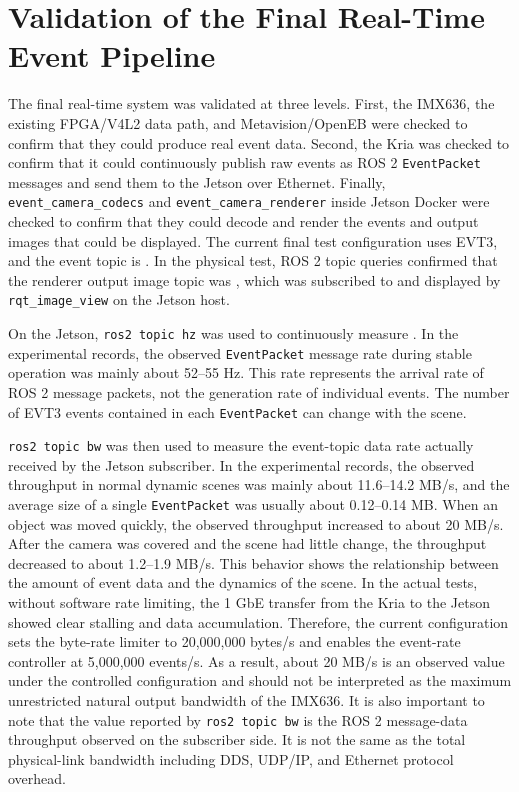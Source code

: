 \section{Validation of the Final Real-Time Event Pipeline}
\label{sec:realtime_results}

The final real-time system was validated at three levels. First, the IMX636, the existing FPGA/V4L2 data path, and Metavision/OpenEB were checked to confirm that they could produce real event data. Second, the Kria was checked to confirm that it could continuously publish raw events as ROS 2 \texttt{EventPacket} messages and send them to the Jetson over Ethernet. Finally, \texttt{event\_camera\_codecs} and \texttt{event\_camera\_renderer} inside Jetson Docker were checked to confirm that they could decode and render the events and output images that could be displayed. The current final test configuration uses EVT3, and the event topic is . In the physical test, ROS 2 topic queries confirmed that the renderer output image topic was , which was subscribed to and displayed by \texttt{rqt\_image\_view} on the Jetson host.

On the Jetson, \texttt{ros2 topic hz} was used to continuously measure . In the experimental records, the observed \texttt{EventPacket} message rate during stable operation was mainly about 52--55 Hz. This rate represents the arrival rate of ROS 2 message packets, not the generation rate of individual events. The number of EVT3 events contained in each \texttt{EventPacket} can change with the scene.

\texttt{ros2 topic bw} was then used to measure the event-topic data rate actually received by the Jetson subscriber. In the experimental records, the observed throughput in normal dynamic scenes was mainly about 11.6--14.2 MB/s, and the average size of a single \texttt{EventPacket} was usually about 0.12--0.14 MB. When an object was moved quickly, the observed throughput increased to about 20 MB/s. After the camera was covered and the scene had little change, the throughput decreased to about 1.2--1.9 MB/s. This behavior shows the relationship between the amount of event data and the dynamics of the scene. In the actual tests, without software rate limiting, the 1 GbE transfer from the Kria to the Jetson showed clear stalling and data accumulation. Therefore, the current configuration sets the byte-rate limiter to 20,000,000 bytes/s and enables the event-rate controller at 5,000,000 events/s. As a result, about 20 MB/s is an observed value under the controlled configuration and should not be interpreted as the maximum unrestricted natural output bandwidth of the IMX636. It is also important to note that the value reported by \texttt{ros2 topic bw} is the ROS 2 message-data throughput observed on the subscriber side. It is not the same as the total physical-link bandwidth including DDS, UDP/IP, and Ethernet protocol overhead.

